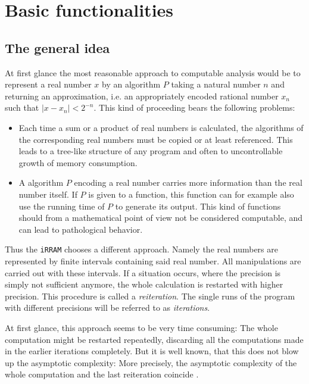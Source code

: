 \documentclass{article}
\newcommand{\irram}{\texttt{iRRAM}\xspace}
\begin{document}
\section{Basic functionalities}

\subsection{The general idea}

At first glance the most reasonable approach to computable analysis would be to represent a real number $x$ by an algorithm $P$ taking a natural number $n$ and returning an approximation, i.e. an appropriately encoded rational number $x_n$ such that $|x-x_n|<2^{-n}$. This kind of proceeding bears the following problems:
\begin{itemize}
\item Each time a sum or a product of real numbers is calculated, the algorithms of the corresponding real numbers must be copied or at least referenced. This leads to a tree-like structure of any program and often to uncontrollable growth of memory consumption.
\item A algorithm $P$ encoding a real number carries more information than the real number itself. If $P$ is given to a function, this function can for example also use the running time of $P$ to generate its output. This kind of functions should from a mathematical point of view not be considered computable, and can lead to pathological behavior.
\end{itemize}

Thus the \irram chooses a different approach. Namely the real numbers are represented by finite intervals containing said real number. All manipulations are carried out with these intervals. If a situation occurs, where the precision is simply not sufficient anymore, the whole calculation is restarted with higher precision. This procedure is called a \emph{reiteration}. The single runs of the program with different precisions will be referred to as \emph{iterations}.

At first glance, this approach seems to be very time consuming: The whole computation might be restarted repeatedly, discarding all the computations made in the earlier iterations completely. But it is well known, that this does not blow up the asymptotic complexity: More precisely, the asymptotic complexity of the whole computation and the last reiteration coincide \cite{}.
\end{document}
